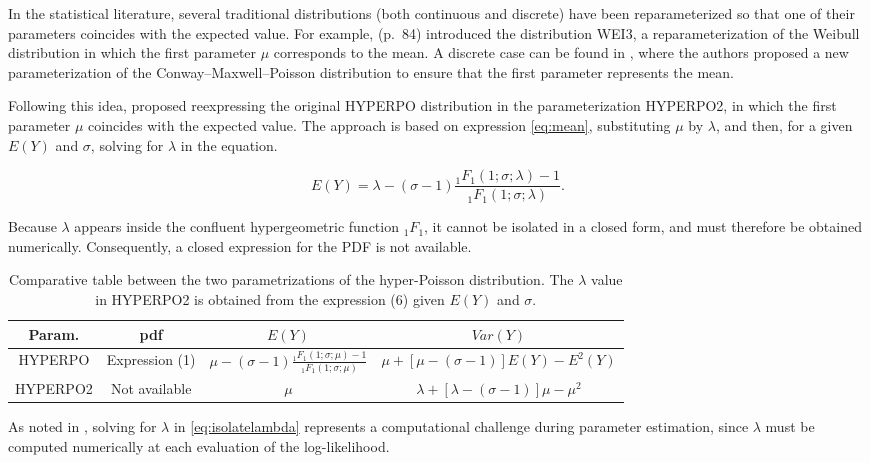 In the statistical literature, several traditional distributions (both continuous and discrete) have been reparameterized so that one of their parameters coincides with the expected value. For example, \citet{rigby2019distributions} (p.~84) introduced the distribution WEI3, a reparameterization of the Weibull distribution in which the first parameter \(\mu\) corresponds to the mean. A discrete case can be found in \citet{ribeiro2020reparametrization}, where the authors proposed a new parameterization of the Conway--Maxwell--Poisson distribution to ensure that the first parameter represents the mean.

Following this idea, \citet{Saez13} proposed reexpressing the original HYPERPO distribution in the parameterization HYPERPO2, in which the first parameter \(\mu\) coincides with the expected value. The approach is based on expression \eqref{eq:mean}, substituting \(\mu\) by \(\lambda\), and then, for a given \(E(Y)\) and \(\sigma\), solving for \(\lambda\) in the equation.

\begin{equation} 
E(Y) = \lambda - (\sigma-1) \frac{_1F_1(1;\sigma;\lambda)-1}{_1F_1(1;\sigma;\lambda)}.
  \label{eq:isolatelambda}
\end{equation}

Because \(\lambda\) appears inside the confluent hypergeometric function \(_1F_1\), it cannot be isolated in a closed form, and must therefore be obtained numerically. Consequently, a closed expression for the PDF is not available.

\begin{table}[h] \centering 
\caption{Comparative table between the two parametrizations of the hyper-Poisson distribution. The $\lambda$ value in HYPERPO2 is obtained from the expression (6) given $E(Y)$ and $\sigma$.} \label{tab:placeholder} 
\begin{tabular}{cccc} \hline 
Param. & pdf & $E(Y)$ & $Var(Y)$ \\ \hline 
HYPERPO & Expression (1) & $\mu - (\sigma-1) \frac{_1F_1(1;\sigma;\mu)-1}{_1F_1(1;\sigma;\mu)}$ & $\mu + \left[ \mu-(\sigma-1) \right] E(Y) - E^2(Y)$ \\ 
HYPERPO2 & Not available & $\mu$ & $\lambda + \left[ \lambda-(\sigma-1) \right] \mu - \mu^2$ \\ \hline 
\end{tabular} 
\end{table}

As noted in \citet{Saez13}, solving for \(\lambda\) in \eqref{eq:isolatelambda} represents a computational challenge during parameter estimation, since \(\lambda\) must be computed numerically at each evaluation of the log-likelihood.

